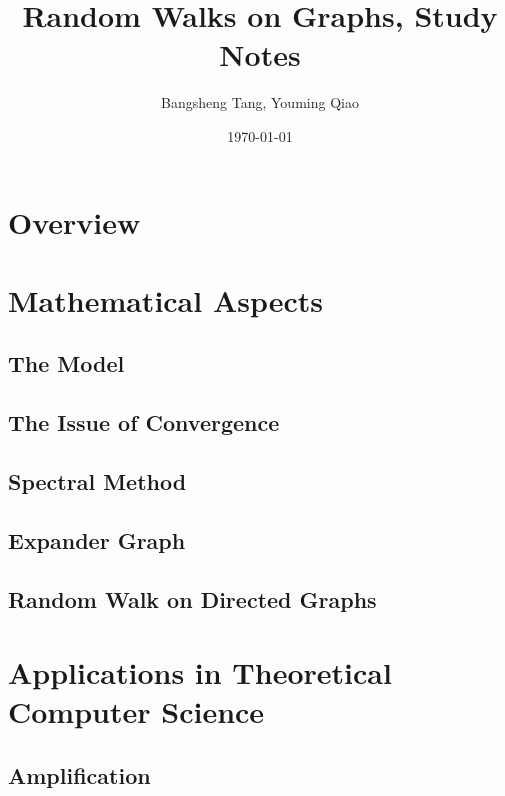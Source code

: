 \documentclass[11pt]{report}
\begin{document}
\title{Random Walks on Graphs, Study Notes}
\author{Bangsheng Tang, Youming Qiao}
\date{\today}
\maketitle \tableofcontents

\chapter{Overview}



\chapter{Mathematical Aspects}

\section{The Model}



\section{The Issue of Convergence}


\section{Spectral Method}


\section{Expander Graph}


\section{Random Walk on Directed Graphs}


\chapter{Applications in Theoretical Computer Science}

\section{Amplification}


%

%

%

%


\end{document}

